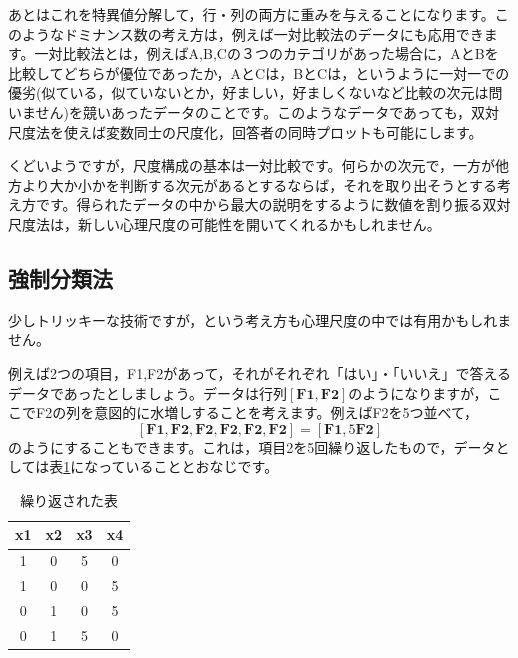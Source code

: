 \documentclass{ltjsbook}
\begin{document}
あとはこれを特異値分解して，行・列の両方に重みを与えることになります。このようなドミナンス数の考え方は，例えば一対比較法のデータにも応用できます。一対比較法とは，例えばA,B,Cの３つのカテゴリがあった場合に，AとBを比較してどちらが優位であったか，AとCは，BとCは，というように一対一での優劣(似ている，似ていないとか，好ましい，好ましくないなど比較の次元は問いません)を競いあったデータのことです。このようなデータであっても，双対尺度法を使えば変数同士の尺度化，回答者の同時プロットも可能にします。

くどいようですが，尺度構成の基本は一対比較です。何らかの次元で，一方が他方より大か小かを判断する次元があるとするならば，それを取り出そうとする考え方です。得られたデータの中から最大の説明をするように数値を割り振る双対尺度法は，新しい心理尺度の可能性を開いてくれるかもしれません。

\subsection{強制分類法}

少しトリッキーな技術ですが，という考え方も心理尺度の中では有用かもしれません。

例えば2つの項目，F1,F2があって，それがそれぞれ「はい」・「いいえ」で答えるデータであったとしましょう。データは行列$[\bm{F1},\bm{F2}]$のようになりますが，ここでF2の列を意図的に水増しすることを考えます。例えばF2を5つ並べて，
\[    [\bm{F1},\bm{F2},\bm{F2},\bm{F2},\bm{F2},\bm{F2}] = [\bm{F1},5\bm{F2}] \]
のようにすることもできます。これは，項目2を5回繰り返したもので，データとしては表\ref{FCexam}になっていることとおなじです。
\begin{table}[ht]
    \begin{center}
        \caption{繰り返された表}
        \begin{tabular}{cc|cc}
            x1 & x2 & x3 & x4 \\
            \hline
            1  & 0  & 5  & 0  \\
            1  & 0  & 0  & 5  \\
            0  & 1  & 0  & 5  \\
            0  & 1  & 5  & 0  \\
        \end{tabular}
        \label{FCexam}
    \end{center}
\end{table}
\end{document}
